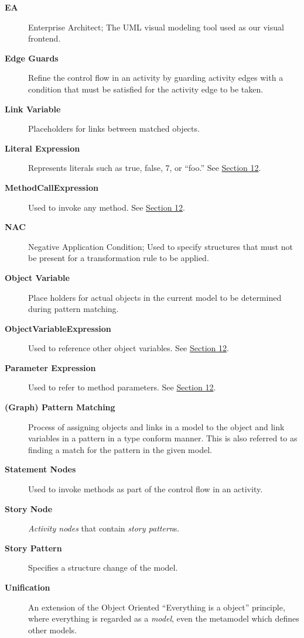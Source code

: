 \begin{description}
\item[\bf EA]
Enterprise Architect; The UML visual modeling tool used as our visual frontend.

\item[\bf Edge Guards]
Refine the control flow in an activity by guarding activity edges with a condition that must be satisfied for the activity edge to be taken.

\item[\bf Link Variable]
Placeholders for links between matched objects.

\item[\bf Literal Expression]
Represents literals such as true, false, 7, or ``foo.'' See \hyperlink{expressionReview}{Section 12}.

\item[\bf MethodCallExpression]
Used to invoke any method. See \hyperlink{expressionReview}{Section 12}.

\item[\bf NAC]
Negative Application Condition; Used to specify structures that must not be present for a transformation rule to be applied.
	
\item[\bf Object Variable]
Place holders for actual objects in the current model to be determined during pattern matching.

\item[\bf ObjectVariableExpression]
Used to reference other object variables. See \hyperlink{expressionReview}{Section 12}.

\item[\bf Parameter Expression]
Used to refer to method parameters. See \hyperlink{expressionReview}{Section 12}.

\item[\bf (Graph) Pattern Matching]
Process of assigning objects and links in a model to the object and link variables in a pattern in a type conform manner. This is also referred to as finding a
match for the pattern in the given model.

\item[\bf Statement Nodes]
Used to invoke methods as part of the control flow in an activity.

\item[\bf Story Node]
\emph{Activity nodes} that contain \emph{story pattern}s.

\item[\bf Story Pattern]
Specifies a structure change of the model.

\item[\bf Unification]
An extension of the Object Oriented ``Everything is a object'' principle, where everything is regarded as a \emph{model}, even the metamodel which defines
other models.

\end{description}
